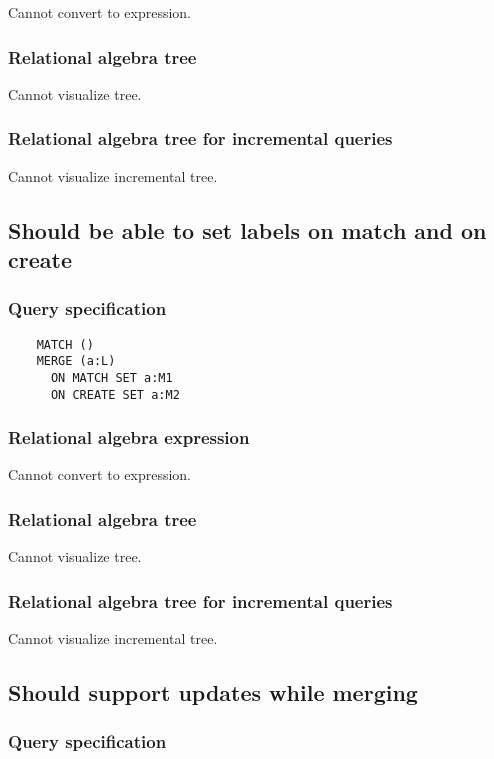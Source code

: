 	Cannot convert to expression.

	\subsubsection*{Relational algebra tree}

	Cannot visualize tree.

	\subsubsection*{Relational algebra tree for incremental queries}

	Cannot visualize incremental tree.
	\subsection{Should be able to set labels on match and on create}

	\subsubsection*{Query specification}

	\begin{lstlisting}
	MATCH ()
	MERGE (a:L)
	  ON MATCH SET a:M1
	  ON CREATE SET a:M2
	\end{lstlisting}


	\subsubsection*{Relational algebra expression}

	Cannot convert to expression.

	\subsubsection*{Relational algebra tree}

	Cannot visualize tree.

	\subsubsection*{Relational algebra tree for incremental queries}

	Cannot visualize incremental tree.
	\subsection{Should support updates while merging}

	\subsubsection*{Query specification}

